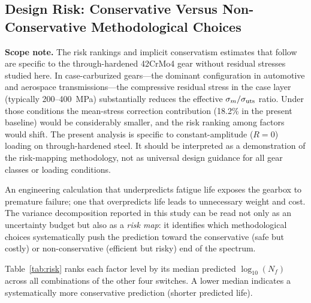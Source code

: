 \documentclass[twocolumn,12pt,a4paper]{article}
\begin{document}
\subsection{Design Risk: Conservative Versus Non-Conservative Methodological Choices}

\textbf{Scope note.} The risk rankings and implicit conservatism
estimates that follow are specific to the through-hardened 42CrMo4
gear without residual stresses studied here. In case-carburized
gears---the dominant configuration in automotive and aerospace
transmissions---the compressive residual stress in the case layer
(typically 200--400~MPa) substantially reduces the effective
$\sigma_m/\sigma_{\rm uts}$ ratio. Under those conditions the
mean-stress correction contribution (18.2\% in the present baseline) would be
considerably smaller, and the risk ranking among factors would shift.
The present analysis is specific to constant-amplitude ($R=0$)
loading on through-hardened steel. It should be interpreted as a
demonstration of the risk-mapping methodology, not as universal
design guidance for all gear classes or loading conditions.

An engineering calculation that underpredicts fatigue life exposes the
gearbox to premature failure; one that overpredicts life leads to
unnecessary weight and cost. The variance decomposition reported in
this study can be read not only as an uncertainty budget but also as a
\emph{risk map}: it identifies which methodological choices
systematically push the prediction toward the conservative (safe but
costly) or non-conservative (efficient but risky) end of the spectrum.

Table~\ref{tab:risk} ranks each factor level by its median predicted
$\log_{10}(N_f)$ across all combinations of the other four switches.
A lower median indicates a systematically more conservative prediction
(shorter predicted life).
\end{document}
